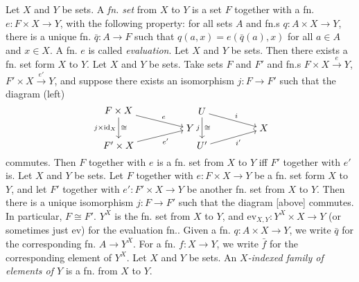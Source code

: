  Let $X$ and $Y$ be sets. A \textit{fn. set} from $X$ to $Y$ is a set $F$ together with a fn. $e \colon F \times X \to Y$, with the following property: for all sets $A$ and fn.s $q \colon A \times X \to Y$, there is a unique fn. $\bar{q} \colon A \to F$ such that $q(a, x) = e(\bar{q}(a), x)$ for all $a \in A$ and $x \in X$. A fn. $e$ is called \textit{evaluation}.
 Let $X$ and $Y$ be sets. Then there exists a fn. set form $X$ to $Y$.
 Let $X$ and $Y$ be sets. Take sets $F$ and $F'$ and fn.s $F \times X \xrightarrow{e} Y$, $F' \times X \xrightarrow{e'} Y$, and suppose there exists an isomorphism $j \colon F \to F'$ such that the diagram (left)
\[\begin{tikzcd}[cramped,row sep=tiny]
    {F \times X} \\
    && Y \\
    {F' \times X}
    \arrow["e", from=1-1, to=2-3]
    \arrow["{j \times \text{id}_X}"', "\cong", from=1-1, to=3-1]
    \arrow["{e'}"', from=3-1, to=2-3]
\end{tikzcd}
\begin{tikzcd}[cramped,row sep=tiny]
    U \\
    && X \\
    {U'}
    \arrow["i", from=1-1, to=2-3]
    \arrow["j"', "\cong", from=1-1, to=3-1]
    \arrow["{i'}"', from=3-1, to=2-3]
\end{tikzcd}\]
commutes. Then $F$ together with $e$ is a fn. set from $X$ to $Y$ iff $F'$ together with $e'$ is.
 Let $X$ and $Y$ be sets. Let $F$ together with $e \colon F \times X \to Y$ be a fn. set form $X$ to $Y$, and let $F'$ together with $e' \colon F' \times X \to Y$ be another fn. set from $X$ to $Y$. Then there is a unique isomorphism $j \colon F \to F'$ such that the diagram [above] commutes. In particular, $F \cong F'$.
 $Y^X$ is the fn. set from $X$ to $Y$, and $\text{ev}_{X, Y} \colon Y^X \times X \to Y$ (or sometimes just $\text{ev}$) for the evaluation fn.. Given a fn. $q \colon A \times X \to Y$, we write $\bar{q}$ for the corresponding fn. $A \to Y^X$. For a fn. $f \colon X \to Y$, we write $\bar{f}$ for the corresponding element of $Y^X$.
 Let $X$ and $Y$ be sets. An \textit{$X$-indexed family of elements of $Y$} is a fn. from $X$ to $Y$.
